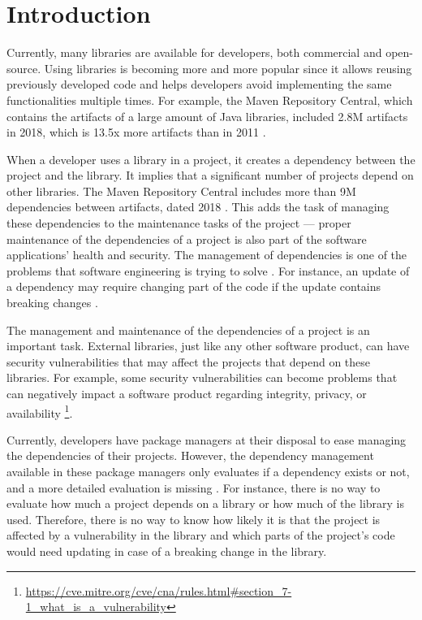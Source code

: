 \chapter{Introduction}\label{ch:Introduction}

Currently, many libraries are available for developers, both commercial and open-source. Using libraries is becoming more and more popular \cite{kikas2017structure} since it allows reusing previously developed code and helps developers avoid implementing the same functionalities multiple times. For example, the Maven Repository Central, which contains the artifacts of a large amount of Java libraries, included 2.8M artifacts in 2018, which is 13.5x more artifacts than in 2011  \cite{Benelallam2019}.

When a developer uses a library in a project, it creates a dependency between the project and the library. It implies that a significant number of projects depend on other libraries. The Maven Repository Central includes more than 9M dependencies between artifacts, dated 2018 \cite{Benelallam2019}. This adds the task of managing these dependencies to the maintenance tasks of the project --- proper maintenance of the dependencies of a project is also part of the software applications' health and security. The management of dependencies is one of the problems that software engineering is trying to solve \cite{kula2014visualizing}. For instance, an update of a dependency may require changing part of the code if the update contains breaking changes \cite{Raemaekers2017}.

The management and maintenance of the dependencies of a project is an important task. External libraries, just like any other software product, can have security vulnerabilities that may affect the projects that depend on these libraries. For example, some security vulnerabilities can become problems that can negatively impact a software product regarding integrity, privacy, or availability \footnote{\url{https://cve.mitre.org/cve/cna/rules.html\#section_7-1_what_is_a_vulnerability}}.

\blankl
Currently, developers have package managers at their disposal to ease managing the dependencies of their projects. However, the dependency management available in these package managers only evaluates if a dependency exists or not, and a more detailed evaluation is missing \cite{hejderup2018prazi}. For instance, there is no way to evaluate how much a project depends on a library or how much of the library is used. Therefore, there is no way to know how likely it is that the project is affected by a vulnerability in the library and which parts of the project's code would need updating in case of a breaking change in the library.

